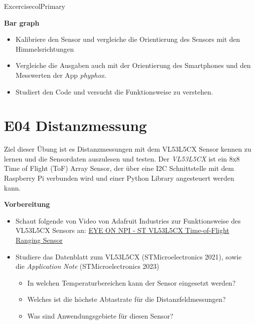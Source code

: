 \documentclass[
  11pt,
  a4paper,
  oneside, openany  ,captions=tableheading
]{scrbook}
\providecommand{\tightlist}{%
  \setlength{\itemsep}{0pt}\setlength{\parskip}{0pt}}
\theoremstyle{remark}
\begin{document}
\begin{boxtitle}{Excercise}{colPrimary}

\textbf{Bar graph}

\begin{itemize}
\tightlist
\item
  Kalibriere den Sensor und vergleiche die Orientierung des Sensors mit
  den Himmelsrichtungen
\item
  Vergleiche die Ausgaben auch mit der Orientierung des Smartphones und
  den Messwerten der App \emph{phyphox}.
\item
  Studiert den Code und versucht die Funktionsweise zu verstehen.
\end{itemize}

\end{boxtitle}

\chapter*{E04 Distanzmessung}\label{e04-distanzmessung}


Ziel dieser Übung ist es Distanzmessungen mit dem VL53L5CX Sensor kennen
zu lernen und die Sensordaten auszulesen und testen. Der \emph{VL53L5CX}
ist ein 8x8 Time of Flight (ToF) Array Sensor, der über eine I2C
Schnittstelle mit dem Raspberry Pi verbunden wird und einer Python
Library angesteuert werden kann.

\textbf{Vorbereitung}

\begin{itemize}
\tightlist
\item
  Schaut folgende von Video von Adafruit Industries zur Funktionsweise
  des VL53L5CX Sensors an:
  \href{https://www.youtube.com/embed/nf527vcKRSE?si=Q2Wm_pS2O1n99-ha}{EYE
  ON NPI - ST VL53L5CX Time-of-Flight Ranging Sensor}
\item
  Studiere das Datenblatt zum VL53L5CX (STMicroelectronics 2021), sowie
  die \emph{Application Note} (STMicroelectronics 2023)

  \begin{itemize}
  \tightlist
  \item
    In welchen Temperaturbereichen kann der Sensor eingesetzt werden?
  \item
    Welches ist die höchste Abtastrate für die Distanzfeldmessungen?
  \item
    Was sind Anwendungsgebiete für diesen Sensor?
  \end{itemize}
\end{itemize}
\end{document}
